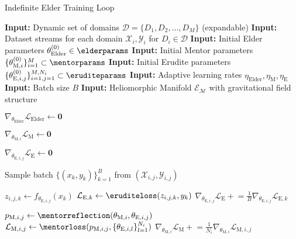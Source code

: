 \begin{algorithm}
\caption{Indefinite Elder Training Loop}
\begin{algorithmic}[1]
\State \textbf{Input:} Dynamic set of domains $\mathcal{D} = \{D_1, D_2, \ldots, D_M\}$ (expandable)
\State \textbf{Input:} Dataset streams for each domain $\mathcal{X}_i, \mathcal{Y}_i$ for $D_i \in \mathcal{D}$
\State \textbf{Input:} Initial Elder parameters $\theta_{\text{Elder}}^{(0)} \in \elderparams$
\State \textbf{Input:} Initial Mentor parameters $\{\theta_{\text{M},i}^{(0)}\}_{i=1}^M \subset \mentorparams$
\State \textbf{Input:} Initial Erudite parameters $\{\theta_{\text{E},i,j}^{(0)}\}_{i=1,j=1}^{M,N_i} \subset \eruditeparams$
\State \textbf{Input:} Adaptive learning rates $\eta_{\text{Elder}}, \eta_{\text{M}}, \eta_{\text{E}}$
\State \textbf{Input:} Batch size $B$
\State \textbf{Input:} Heliomorphic Manifold $\mathcal{E}_{\mathcal{M}}$ with gravitational field structure

 
    \State $\nabla_{\theta_{\text{Elder}}} \mathcal{L}_{\text{Elder}} \gets \mathbf{0}$ 
    
        \State $\nabla_{\theta_{\text{M},i}} \mathcal{L}_{\text{M}} \gets \mathbf{0}$ 
        
         
            \State $\nabla_{\theta_{\text{E},i,j}} \mathcal{L}_{\text{E}} \gets \mathbf{0}$ 
            
            \State Sample batch $\{(x_k, y_k)\}_{k=1}^B$ from $(\mathcal{X}_{i,j}, \mathcal{Y}_{i,j})$
            
                \State $z_{i,j,k} \gets f_{\theta_{\text{E},i,j}}(x_k)$ 
                \State $\mathcal{L}_{\text{E},k} \gets \eruditeloss(z_{i,j,k}, y_k)$ 
                \State $\nabla_{\theta_{\text{E},i,j}} \mathcal{L}_{\text{E}} \mathrel{+}= \frac{1}{B} \nabla_{\theta_{\text{E},i,j}} \mathcal{L}_{\text{E},k}$ 
            \EndFor
            
            \State $p_{\text{M},i,j} \gets \mentorreflection(\theta_{\text{M},i}, \theta_{\text{E},i,j})$ 
            \State $\mathcal{L}_{\text{M},i,j} \gets \mentorloss(p_{\text{M},i,j}, \{\theta_{\text{E},i,l}\}_{l=1}^{N_i})$ 
            \State $\nabla_{\theta_{\text{M},i}} \mathcal{L}_{\text{M}} \mathrel{+}= \frac{1}{N_i} \nabla_{\theta_{\text{M},i}} \mathcal{L}_{\text{M},i,j}$ 
        \EndFor
        

\end{algorithmic}
\end{algorithm}
